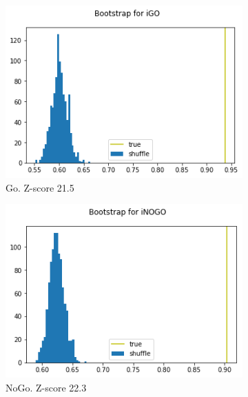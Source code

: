 \documentclass[a4paper,10pt]{article}
\begin{document}
\begin{figure}
    \centering
    \begin{subfigure}[b]{0.4\textwidth}
        \includegraphics[width=\textwidth]{img/example_neuro_classifiability_go.png}
        \caption{Go. Z-score 21.5}
        \label{fig:neuro_classifiability_go}
    \end{subfigure}\hspace{0.05\textwidth}
    \begin{subfigure}[b]{0.4\textwidth}
        \includegraphics[width=\textwidth]{img/example_neuro_classifiability_nogo.png}
        \caption{NoGo. Z-score 22.3}
        \label{fig:neuro_classifiability_nogo}
    \end{subfigure}
    \begin{subfigure}[b]{0.4\textwidth}

\end{subfigure}
\end{figure}
\end{document}
